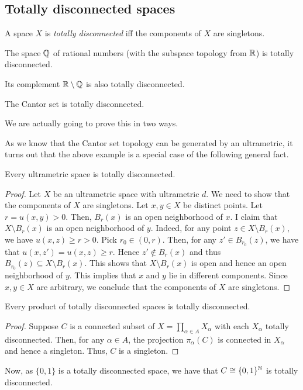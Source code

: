\subsection*{Totally disconnected spaces}

\begin{definition}
    A space $X$ is \emph{totally disconnected} iff the components of $X$ are singletons.
\end{definition}

\begin{example}
    The space $\mathbb{Q}$ of rational numbers (with the subspace topology from $\mathbb{R}$) is totally disconnected.

    Its complement $\mathbb{R}\setminus\mathbb{Q}$ is also totally disconnected.
\end{example}

\begin{example}
    The Cantor set is totally disconnected.
\end{example}

We are actually going to prove this in two ways.

As we know that the Cantor set topology can be generated by an ultrametric, it turns out that the above example is a special case of the following general fact.

\begin{theorem}
    Every ultrametric space is totally disconnected.
\end{theorem}

\begin{proof}
    Let $X$ be an ultrametric space with ultrametric $d$. We need to show that the components of $X$ are singletons. Let $x,y\in X$ be distinct points. Let $r = {u(x,y)} > 0$. Then, $B_r(x)$ is an open neighborhood of $x$. I claim that $X\setminus B_r(x)$ is an open neighborhood of $y$. Indeed, for any point $z\in X\setminus B_r(x)$, we have $u(x,z) \geq r > 0$. Pick $r_0\in(0,r)$. Then, for any $z'\in B_{r_0}(z)$, we have that $u(x,z')=u(x,z)\geq r$. Hence $z'\notin B_r(x)$ and thus $B_{r_0}(z)\subseteq X\setminus B_r(x)$. This shows that $X\setminus B_r(x)$ is open and hence an open neighborhood of $y$. This implies that $x$ and $y$ lie in different components. Since $x,y\in X$ are arbitrary, we conclude that the components of $X$ are singletons.
\end{proof}


\begin{theorem}
    Every product of totally disconnected spaces is totally disconnected.
\end{theorem}
\begin{proof}
    Suppose $C$ is a connected subset of $X=\prod_{\alpha\in A}X_\alpha$ with each $X_\alpha$ totally disconnected. Then, for any $\alpha\in A$, the projection $\pi_\alpha(C)$ is connected in $X_\alpha$ and hence a singleton. Thus, $C$ is a singleton.
\end{proof}

Now, as $\{0,1\}$ is a totally disconnected space, we have that $C\cong \{0,1\}^{\mathbb{N}}$ is totally disconnected.
\newpage
